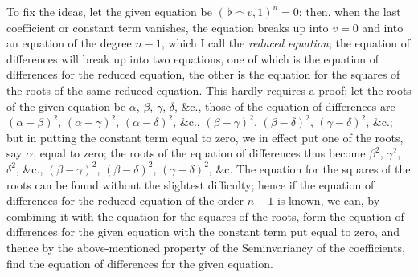 \documentclass[11pt,a4paper]{article}
\theoremstyle{definition}
\begin{document}
To fix the ideas, let the given equation be $(\,\flat\,\frown\, v,1)^n=0$; then, when the last coefficient or constant term vanishes, the equation breaks up into $v=0$ and into an equation of the degree $n-1$, which I call the \textit{reduced equation}; the equation of differences will break up into two equations, one of which is the equation of differences for the reduced equation, the other is the equation for the squares of the roots of the same reduced equation. This hardly requires a proof; let the roots of the given equation be $\alpha$, $\beta$, $\gamma$, $\delta$, \&c., those of the equation of differences are $(\alpha-\beta)^2$, $(\alpha-\gamma)^2$, $(\alpha-\delta)^2$, \&c., $(\beta-\gamma)^2$, $(\beta-\delta)^2$, $(\gamma-\delta)^2$, \&c.; but in putting the constant term equal to zero, we in effect put one of the roots, say $\alpha$, equal to zero; the roots of the equation of differences thus become $\beta^2$, $\gamma^2$, $\delta^2$, \&c., $(\beta-\gamma)^2$, $(\beta-\delta)^2$, $(\gamma-\delta)^2$, \&c. The equation for the squares of the roots can be found without the slightest difficulty; hence if the equation of differences for the reduced equation of the order $n-1$ is known, we can, by combining it with the equation for the squares of the roots, form the equation of differences for the given equation with the constant term put equal to zero, and thence by the above-mentioned property of the Seminvariancy of the coefficients, find the equation of differences for the given equation.
\end{document}
